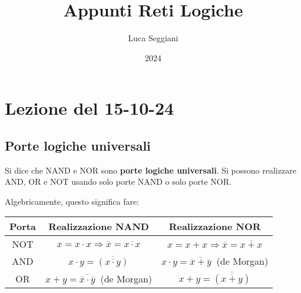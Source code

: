\documentclass[a4paper,11pt]{article}
\title{Appunti Reti Logiche}
\author{Luca Seggiani}
\date{2024}
\begin{document}
\section{Lezione del 15-10-24}

\thispagestyle{empty}
\pagestyle{fancy}

\subsection{Porte logiche universali}
Si dice che NAND e NOR sono \textbf{porte logiche universali}.
Si possono realizzare AND, OR e NOT usando solo porte NAND o solo porte NOR.

Algebricamente, questo significa fare:
\begin{table}[h!]
	\center {}
	\begin{tabular} { c || c | c }
		\bfseries Porta & \bfseries Realizzazione NAND & \bfseries Realizzazione NOR \\
		\hline 
		NOT & $ x = x \cdot x \Rightarrow \overline{x} = \overline{x \cdot x} $ & $ x = x + x \Rightarrow \overline{x} = \overline{x + x} $ \\
		AND & $ x \cdot y = \overline{\left( \overline{x \cdot y} \right)} $ & $ x \cdot y = \overline{\overline{x} + \overline{y}} \ $ (de Morgan) \\
		OR & $ x + y = \overline{\overline{x} \cdot \overline{y}} \ $ (de Morgan) & $ x + y = \overline{\left( \overline{x + y} \right)} $ \\
	\end{tabular}
\end{table}
\end{document}
